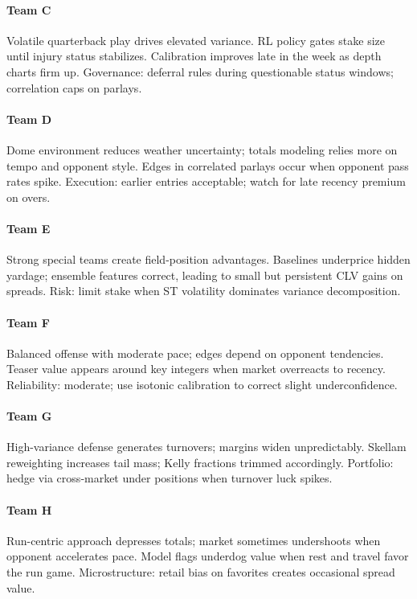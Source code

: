 \documentclass[12pt]{report}  %
\numberwithin{equation}{section}
\theoremstyle{plain}
\theoremstyle{definition}
\theoremstyle{remark}
\begin{document}
\paragraph{Team C} Volatile quarterback play drives elevated variance. RL policy gates stake size until injury status stabilizes. Calibration improves late in the week as depth charts firm up. Governance: deferral rules during questionable status windows; correlation caps on parlays.

\paragraph{Team D} Dome environment reduces weather uncertainty; totals modeling relies more on tempo and opponent style. Edges in correlated parlays occur when opponent pass rates spike. Execution: earlier entries acceptable; watch for late recency premium on overs.

\paragraph{Team E} Strong special teams create field-position advantages. Baselines underprice hidden yardage; ensemble features correct, leading to small but persistent CLV gains on spreads. Risk: limit stake when ST volatility dominates variance decomposition.

\paragraph{Team F} Balanced offense with moderate pace; edges depend on opponent tendencies. Teaser value appears around key integers when market overreacts to recency. Reliability: moderate; use isotonic calibration to correct slight underconfidence.

\paragraph{Team G} High-variance defense generates turnovers; margins widen unpredictably. Skellam reweighting increases tail mass; Kelly fractions trimmed accordingly. Portfolio: hedge via cross‑market under positions when turnover luck spikes.

\paragraph{Team H} Run-centric approach depresses totals; market sometimes undershoots when opponent accelerates pace. Model flags underdog value when rest and travel favor the run game. Microstructure: retail bias on favorites creates occasional spread value.
\end{document}
